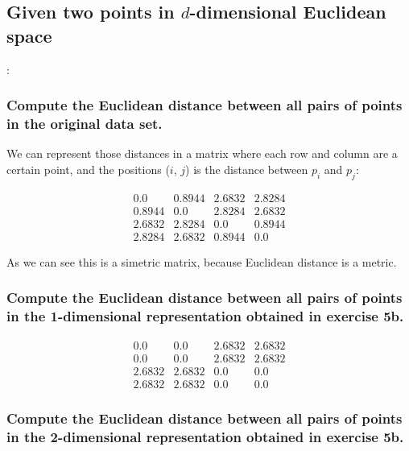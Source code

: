 \documentclass[12pt]{article}
\begin{document}
\subsection{Given two points in $d$-dimensional Euclidean space}:

\subsubsection{Compute the Euclidean distance between all pairs of points in the original data set.}

We can represent those distances in a matrix where each row and column are a certain point, and the positions ($i$, $j$) is the distance between $p_i$ and $p_j$:

\begin{equation}
    \begin{matrix}
        0.0 & 0.8944 & 2.6832 & 2.8284 \\
        0.8944 & 0.0 & 2.8284 & 2.6832 \\
        2.6832 & 2.8284 &  0.0 & 0.8944 \\
        2.8284 & 2.6832 &  0.8944 & 0.0    
    \end{matrix}
\end{equation}

As we can see this is a simetric matrix, because Euclidean distance is a metric.

\subsubsection{Compute the Euclidean distance between all pairs of points in the 1-dimensional representation obtained in exercise 5b.}

\begin{equation}
    \begin{matrix}
        0.0 & 0.0 & 2.6832 & 2.6832 \\
        0.0 & 0.0 & 2.6832 & 2.6832 \\
        2.6832 & 2.6832 &  0.0 & 0.0 \\
        2.6832 & 2.6832 &  0.0 & 0.0    
    \end{matrix}
\end{equation}

\subsubsection{Compute the Euclidean distance between all pairs of points in the 2-dimensional representation obtained in exercise 5b.}
\end{document}
